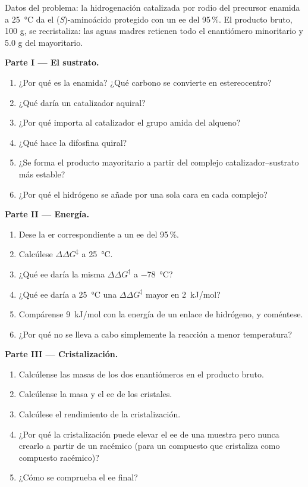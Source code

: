 \begin{problem}
\label{pb:b3:asymmetric-synthesis:1}
Datos del problema: la hidrogenación catalizada por rodio del precursor
enamida a \qty{25}{\celsius} da el (\textit{S})-aminoácido protegido con un ee del 95\,\%. El producto
bruto, 100 g, se recristaliza: las aguas madres retienen todo el enantiómero
minoritario y 5.0 g del mayoritario.

\medskip\noindent\textbf{Parte I --- El sustrato.}
\begin{enumerate}
  \item ¿Por qué es  la enamida? ¿Qué carbono se convierte en estereocentro?
  \item ¿Qué daría un catalizador aquiral?
  \item ¿Por qué importa al catalizador el grupo amida del alqueno?
  \item ¿Qué hace la difosfina quiral?
  \item ¿Se forma el producto mayoritario a partir del complejo catalizador--sustrato más
        estable?
  \item ¿Por qué el hidrógeno se añade por una sola cara en cada complejo?
\end{enumerate}

\medskip\noindent\textbf{Parte II --- Energía.}
\begin{enumerate}[resume]
  \item Dese la er correspondiente a un ee del 95\,\%.
  \item Calcúlese $\Delta\Delta G^\ddagger$ a \qty{25}{\celsius}.
  \item ¿Qué ee daría la misma $\Delta\Delta G^\ddagger$ a \qty{-78}{\celsius}?
  \item ¿Qué ee daría a \qty{25}{\celsius} una $\Delta\Delta G^\ddagger$ mayor en \qty{2}{kJ/mol}?
  \item Compárense \qty{9}{kJ/mol} con la energía de un enlace de hidrógeno, y coméntese.
  \item ¿Por qué no se lleva a cabo simplemente la reacción a menor temperatura?
\end{enumerate}

\medskip\noindent\textbf{Parte III --- Cristalización.}
\begin{enumerate}[resume]
  \item Calcúlense las masas de los dos enantiómeros en el producto bruto.
  \item Calcúlense la masa y el ee de los cristales.
  \item Calcúlese el rendimiento de la cristalización.
  \item ¿Por qué la cristalización puede elevar el ee de una muestra pero nunca crearlo a partir de un
        racémico (para un compuesto que cristaliza como compuesto racémico)?
  \item ¿Cómo se comprueba el ee final?
\end{enumerate}


\end{problem}
